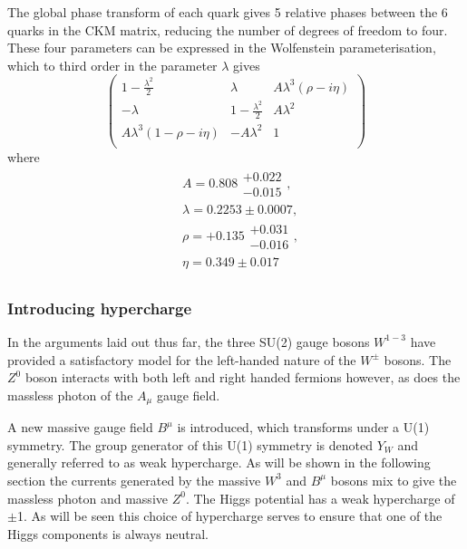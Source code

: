 The global phase transform of each quark gives 5 relative phases between the 6 quarks in the CKM matrix, reducing the number of degrees of freedom to four. These four parameters can be expressed in the Wolfenstein parameterisation, which to third order in the parameter $\lambda$ gives ~\cite{wolf}
\begin{equation}
  \begin{pmatrix}1 - \frac{\lambda^{2}}{2} &\lambda& A\lambda^{3}(\rho - i\eta)\\-\lambda&1-\frac{\lambda^{2}}{2} & A\lambda^{2}\\ A\lambda^{3}(1-\rho - i\eta)&-A\lambda^{2}&1\\\end{pmatrix}
\end{equation}
where 
\begin{equation}
  \begin{split} 
    &A = 0.808\substack{+0.022\\-0.015}, \\
    & \lambda = 0.2253\pm 0.0007,  \\
    & \rho =+ 0.135\substack{+0.031\\-0.016}, \\
    &\eta = 0.349\pm0.017\\
    \end{split}
\end{equation}

\subsubsection{Introducing hypercharge}
In the arguments laid out thus far, the three SU(2) gauge bosons $W^{1-3}$ have provided a satisfactory model for the left-handed nature of the $W^{\pm}$ bosons. The $Z^{0}$ boson interacts with both left and right handed fermions however, as does the massless photon of the $A_{\mu}$ gauge field.

A new massive gauge field $B^{\mu}$ is introduced, which transforms under a U(1) symmetry. The group generator of this U(1) symmetry is denoted $Y_{W}$ and generally referred to as weak hypercharge. As will be shown in the following section the currents generated by the massive $W^{3}$ and $B^{\mu}$ bosons mix to give the massless photon and massive $Z^{0}$. The Higgs potential has a weak hypercharge of $\pm$1. As will be seen this choice of hypercharge serves to ensure that one of the Higgs components is always neutral.%

